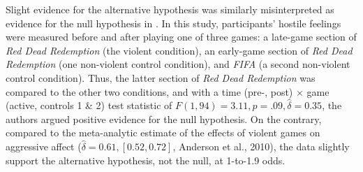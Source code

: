 \documentclass[man]{apa6}
\begin{document}
Slight evidence for the alternative hypothesis was similarly misinterpreted as evidence for the null hypothesis in \citet{Valadez:Ferguson:2012}. In this study, participants' hostile feelings were measured before and after playing one of three games: a late-game section of {\em Red Dead Redemption} (the violent condition), an early-game section of {\em Red Dead Redemption} (one non-violent control condition), and {\em FIFA} (a second non-violent control condition). Thus, the latter section of {\em Red Dead Redemption} was compared to the other two conditions, and with a time (pre-, post) $\times$ game (active, controls 1 \& 2) test statistic of $F(1, 94) = 3.11, p = .09, \hat{\delta} = 0.35$, the authors argued positive evidence for the null hypothesis. On the contrary, compared to the meta-analytic estimate of the effects of violent games on aggressive affect ($\hat{\delta} = 0.61, [0.52, 0.72]$, Anderson et al., 2010), the data slightly support the alternative hypothesis, not the null, at 1-to-1.9 odds. 


\end{document}

